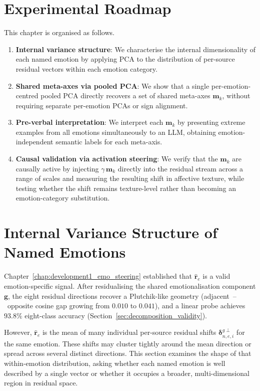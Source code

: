 \section*{Experimental Roadmap}

This chapter is organised as follows.
\begin{enumerate}
  \item \textbf{Internal variance structure}: We characterise the internal dimensionality of each named emotion by applying PCA to the distribution of per-source residual vectors within each emotion category.
  \item \textbf{Shared meta-axes via pooled PCA}: We show that a single per-emotion-centred pooled PCA directly recovers a set of shared meta-axes $\mathbf{m}_k$, without requiring separate per-emotion PCAs or sign alignment.
  \item \textbf{Pre-verbal interpretation}: We interpret each $\mathbf{m}_k$ by presenting extreme examples from all emotions simultaneously to an LLM, obtaining emotion-independent semantic labels for each meta-axis.
  \item \textbf{Causal validation via activation steering}: We verify that the $\mathbf{m}_k$ are causally active by injecting $\gamma\,\mathbf{m}_k$ directly into the residual stream across a range of scales and measuring the resulting shift in affective texture, while testing whether the shift remains texture-level rather than becoming an emotion-category substitution.
\end{enumerate}

\section{Internal Variance Structure of Named Emotions}
\label{sec:ch2-variance-structure}

Chapter~\ref{chap:development1_emo_steering} established that $\hat{\mathbf{r}}_e$ is a valid emotion-specific signal. After residualising the shared emotionalisation component $\mathbf{g}$, the eight residual directions recover a Plutchik-like geometry (adjacent~--~opposite cosine gap growing from $0.010$ to $0.041$), and a linear probe achieves $93.8\%$ eight-class accuracy (Section~\ref{sec:decomposition_validity}).\par

However, $\hat{\mathbf{r}}_e$ is the mean of many individual per-source residual shifts $\boldsymbol{\delta}^{g\perp}_{n,e,i}$ for the same emotion. These shifts may cluster tightly around the mean direction or spread across several distinct directions. This section examines the shape of that within-emotion distribution, asking whether each named emotion is well described by a single vector or whether it occupies a broader, multi-dimensional region in residual space.\par

